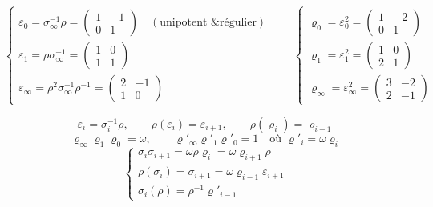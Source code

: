 \documentclass[11pt,a4paper]{article}
\begin{document}
\[
\begin{cases}
\boxed{\varepsilon_0 = \sigma_\infty^{-1}\rho = \begin{pmatrix} 1 & -1 \\ 0 & 1 \end{pmatrix}} \quad (\text{unipotent \& régulier}) \\[4pt]
\boxed{\varepsilon_1 = \rho\sigma_\infty^{-1} = \begin{pmatrix} 1 & 0 \\ 1 & 1 \end{pmatrix}} \\[4pt]
\varepsilon_\infty = \rho^2\sigma_\infty^{-1}\rho^{-1} = \begin{pmatrix} 2 & -1 \\ 1 & 0 \end{pmatrix}
\end{cases}
\qquad
\begin{cases}
\varrho_0 = \varepsilon_0^2 = \begin{pmatrix} 1 & -2 \\ 0 & 1 \end{pmatrix} \\[4pt]
\varrho_1 = \varepsilon_1^2 = \begin{pmatrix} 1 & 0 \\ 2 & 1 \end{pmatrix} \\[4pt]
\varrho_\infty = \varepsilon_\infty^2 = \begin{pmatrix} 3 & -2 \\ 2 & -1 \end{pmatrix}
\end{cases}
\]

\struck{\ill{}}
\[
\varepsilon_i = \sigma_i^{-1}\rho, \qquad \rho(\varepsilon_i) = \varepsilon_{i+1}, \qquad \rho(\varrho_i) = \varrho_{i+1}
\]
\[
\varrho_\infty\varrho_1\varrho_0 = \omega, \qquad
\varrho'_\infty\varrho'_1\varrho'_0 = 1 \quad \text{où } \varrho'_i = \omega\varrho_i
\]
\[
\begin{cases}
\sigma_i\sigma_{i+1} = \omega\rho\varrho_i = \omega\varrho_{i+1}\rho \\
\rho(\sigma_i) = \sigma_{i+1} = \omega\varrho_{i-1}\varepsilon_{i+1} \\
\sigma_i(\rho) = \rho^{-1}\varrho'_{i-1}
\end{cases}
\]
\end{document}
